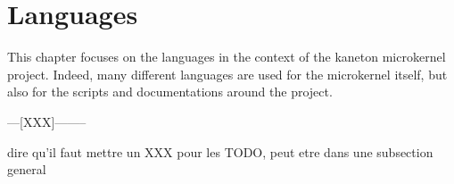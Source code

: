 %
%
%
%
%
%

%
%

\chapter{Languages}

This chapter focuses on the languages in the context of the kaneton microkernel
project. Indeed, many different languages are used for the microkernel itself,
but also for the scripts and documentations around the project.

\newpage

%
%












---[XXX]--------

dire qu'il faut mettre un XXX pour les TODO, peut etre dans une
subsection general
